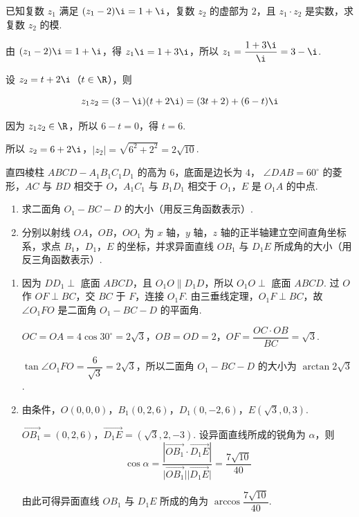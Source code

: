 \begin{problem}
已知复数 \(z_{1} \) 满足 \((z_{1}-2)\i=1+\i \)，复数 \(z_{2} \) 的虚部为 \(2\)，且 \(z_{1}\cdot z_{2} \) 是实数，求复数 \(z_{2} \) 的模.
\end{problem}

\begin{solution}
由 \((z_1-2)\i=1+\i\)，得 \(z_1\i=1+3\i\)，所以 \(z_1=\dfrac{1+3\i}{\i}=3-\i\).

设 \(z_2=t+2\i\)（\(t\in\R\)），则

\[
z_1z_2=(3-\i)(t+2\i)=(3t+2)+(6-t)\i
\]

因为 \(z_1z_2\in\R\)，所以 \(6-t=0\)，得 \(t=6\).

所以 \(z_2=6+2\i\)，\(\lvert z_2\rvert=\sqrt{6^2+2^2}=2\sqrt{10}\).
\end{solution}

\begin{problem}
直四棱柱 \(ABCD - A_{1}B_{1}C_{1}D_{1} \) 的高为 \(6\)，底面是边长为 \(4\)， \(\angle DAB = 60^{\circ} \) 的菱形，\(AC\) 与 \(BD\) 相交于 \(O\)，\(A_{1}C_{1}\) 与 \(B_{1}D_{1}\) 相交于 \(O_{1}\)，\(E\) 是 \(O_{1}A\) 的中点.

\begin{enumerate}
\item 求二面角 \(O_{1}-BC-D \) 的大小（用反三角函数表示）.
\item 分别以射线 \(OA\)，\(OB\)，\(OO_{1}\) 为 \(x\) 轴，\(y\) 轴，\(z\) 轴的正半轴建立空间直角坐标系，求点 \(B_{1}\)，\(D_{1}\)，\(E\) 的坐标，并求异面直线 \(OB_{1}\) 与 \(D_{1}E\) 所成角的大小（用反三角函数表示）.
\end{enumerate}
\end{problem}

\begin{solution}
\begin{enumerate}
\item 因为 \(DD_1\perp\) 底面 \(ABCD\)，且 \(O_1O\parallel D_1D\)，所以 \(O_1O\perp\) 底面 \(ABCD\). 过 \(O\) 作 \(OF\perp BC\)，交 \(BC\) 于 \(F\)，连接 \(O_1F\). 由三垂线定理，\(O_1F\perp BC\)，故 \(\angle O_1FO\) 是二面角 \(O_1-BC-D\) 的平面角.

\(OC=OA=4\cos30^{\circ}=2\sqrt{3}\)，\(OB=OD=2\)，\(OF=\dfrac{OC\cdot OB}{BC}=\sqrt{3}\).

\(\tan\angle O_1FO=\dfrac{6}{\sqrt{3}}=2\sqrt{3}\)，所以二面角 \(O_1-BC-D\) 的大小为 \(\arctan 2\sqrt{3}\).

\item 由条件，\(O(0,0,0)\)，\(B_1(0,2,6)\)，\(D_1(0,-2,6)\)，\(E(\sqrt{3},0,3)\).

\(\overrightarrow{OB_1}=(0,2,6)\)，\(\overrightarrow{D_1E}=(\sqrt{3},2,-3)\). 设异面直线所成的锐角为 \(\alpha\)，则
\[
\cos\alpha=\frac{\left\lvert\overrightarrow{OB_1}\cdot\overrightarrow{D_1E}\right\rvert}{\lvert\overrightarrow{OB_1}\rvert\lvert\overrightarrow{D_1E}\rvert}=\frac{7\sqrt{10}}{40}
\]

由此可得异面直线 \(OB_1\) 与 \(D_1E\) 所成的角为 \(\arccos\dfrac{7\sqrt{10}}{40}\).
\end{enumerate}
\end{solution}

